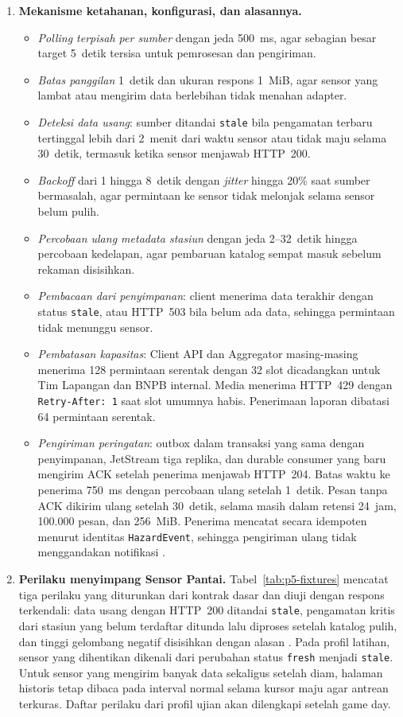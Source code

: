 \begin{enumerate}
\item \textbf{Mekanisme ketahanan, konfigurasi, dan alasannya.}
\begin{itemize}
\item \emph{Polling terpisah per sumber} dengan jeda 500~ms, agar sebagian besar target 5~detik tersisa untuk pemrosesan dan pengiriman.
\item \emph{Batas panggilan} 1~detik dan ukuran respons 1~MiB, agar sensor yang lambat atau mengirim data berlebihan tidak menahan adapter.
\item \emph{Deteksi data usang}: sumber ditandai \texttt{stale} bila pengamatan terbaru tertinggal lebih dari 2~menit dari waktu sensor atau tidak maju selama 30~detik, termasuk ketika sensor menjawab HTTP~200.
\item \emph{Backoff} dari 1 hingga 8~detik dengan \emph{jitter} hingga 20\% saat sumber bermasalah, agar permintaan ke sensor tidak melonjak selama sensor belum pulih.
\item \emph{Percobaan ulang metadata stasiun} dengan jeda 2--32~detik hingga percobaan kedelapan, agar pembaruan katalog sempat masuk sebelum rekaman disisihkan.
\item \emph{Pembacaan dari penyimpanan}: client menerima data terakhir dengan status \texttt{stale}, atau HTTP~503  bila belum ada data, sehingga permintaan tidak menunggu sensor.
\item \emph{Pembatasan kapasitas}: Client API dan Aggregator masing-masing menerima 128 permintaan serentak dengan 32 slot dicadangkan untuk Tim Lapangan dan BNPB internal. Media menerima HTTP~429 dengan \texttt{Retry-After: 1} saat slot umumnya habis. Penerimaan laporan dibatasi 64 permintaan serentak.
\item \emph{Pengiriman peringatan}: outbox dalam transaksi yang sama dengan penyimpanan, JetStream tiga replika, dan durable consumer yang baru mengirim ACK setelah penerima menjawab HTTP~204. Batas waktu ke penerima 750~ms dengan percobaan ulang setelah 1~detik. Pesan tanpa ACK dikirim ulang setelah 30~detik, selama masih dalam retensi 24~jam, 100.000 pesan, dan 256~MiB. Penerima mencatat secara idempoten menurut identitas \texttt{HazardEvent}, sehingga pengiriman ulang tidak menggandakan notifikasi \cite{nats}.
\end{itemize}

\item \textbf{Perilaku menyimpang Sensor Pantai.} Tabel~\ref{tab:p5-fixtures} mencatat tiga perilaku yang diturunkan dari kontrak dasar dan diuji dengan respons terkendali: data usang dengan HTTP~200 ditandai \texttt{stale}, pengamatan kritis dari stasiun yang belum terdaftar ditunda lalu diproses setelah katalog pulih, dan tinggi gelombang negatif disisihkan dengan alasan . Pada profil latihan, sensor yang dihentikan dikenali dari perubahan status \texttt{fresh} menjadi \texttt{stale}. Untuk sensor yang mengirim banyak data sekaligus setelah diam, halaman historis tetap dibaca pada interval normal selama kursor maju agar antrean terkuras. Daftar perilaku dari profil ujian akan dilengkapi setelah game day.


\end{enumerate}
